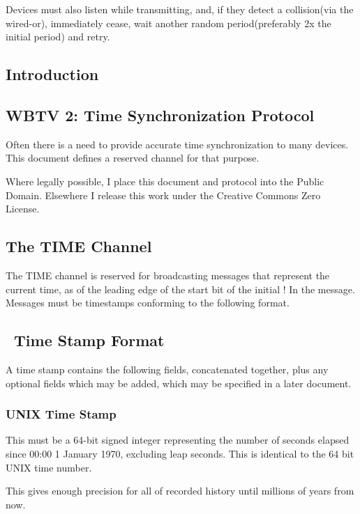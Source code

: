 \documentclass{article}
\begin{document}
Devices must also listen while transmitting, and, if they detect a collision(via the wired-or), immediately cease, wait another random period(preferably 2x the initial period) and retry.

\subsection[Introduction]{Introduction}
\begin{center}
\begin{minipage}{7.5134in}
\section{WBTV 2: Time Synchronization Protocol}
\end{minipage}
\end{center}
Often there is a need to provide accurate time synchronization to many devices. This document defines a reserved channel for that purpose.

Where legally possible, I place this document and protocol into the Public Domain. Elsewhere I release this work under the Creative Commons Zero License.

\subsection{The TIME Channel}
The TIME channel is reserved for broadcasting messages that represent the current time, as of the leading edge of the start bit of the initial ! In the message. Messages must be timestamps conforming to the following format.

\subsection[\ Time Stamp Format]{\ Time Stamp Format}
A time stamp contains the following fields, concatenated together, plus any optional fields which may be added, which may be specified in a later document.

\subsubsection{UNIX Time Stamp}
This must be a 64-bit signed integer representing the number of seconds elapsed since 00:00 1 January 1970, excluding leap seconds. This is identical to the 64 bit UNIX time number.

This gives enough precision for all of recorded history until millions of years from now.
\end{document}
